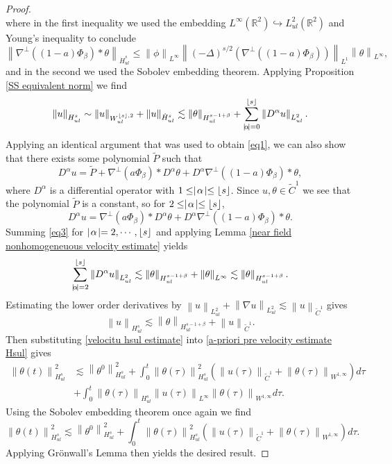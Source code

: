 \documentclass[12pt,xcolor=svgnames]{amsart}
\newcommand{\R}{\mathbb{R}}
\newcommand{\abs}[1]{\mid\!#1\!\mid}
\newcommand{\norm}[2]{\left\lVert#1\right\rVert_{#2}}
\DeclarePairedDelimiter\floor{\lfloor}{\rfloor}
\begin{document}
\begin{proof}
$$$$
where in the first inequality we used the embedding $L^{\infty}(\R^2) \hookrightarrow L^2_{ul}(\R^2)$ and Young's inequality to conclude
$$
\norm{\nabla^{\perp}((1-a)\Phi_{\beta}) \ast \theta}{\dot{H}^s_{ul}}\leq \norm{\phi}{L^{\infty}}\norm{(-\Delta)^{s/2}(\nabla^{\perp}((1-a)\Phi_{\beta}))}{L^1}\norm{\theta}{L^{\infty}},
$$
and in the second we used the Sobolev embedding theorem. Applying Proposition \ref{SS equivalent norm} we find
$$
\norm{u}{H_{ul}^s} \sim \norm{u}{W_{ul}^{\floor{s},2}} + \norm{u}{\dot{H}_{ul}^s} \lesssim \norm{\theta}{H_{ul}^{s-1+\beta}}+\sum_{\abs{\alpha}=0}^{\floor{s}} \norm{D^{\alpha} u}{L_{ul}^2}.
$$
Applying an identical argument that was used to obtain \eqref{eq1}, we can also show that there exists some polynomial $\tilde{P}$ such that 
\begin{equation}
\label{eq2}
D^{\alpha} u = \tilde{P} + \nabla^{\perp}(a\Phi_{\beta}) \ast D^{\alpha} \theta + D^{\alpha} \nabla^{\perp}((1-a)\Phi_{\beta}) \ast \theta,
\end{equation}
where $D^{\alpha}$ is a differential operator with $1 \leq \abs{\alpha}\leq \floor{s}$. Since $u,\theta \in \tilde{C}^1$ we see that the polynomial $\tilde{P}$ is a constant, so for $2 \leq \abs{\alpha} \leq \floor{s}$,  
\begin{equation}
\label{eq3}
D^{\alpha} u = \nabla^{\perp}(a\Phi_{\beta}) \ast D^{\alpha} \theta + D^{\alpha} \nabla^{\perp}((1-a)\Phi_{\beta}) \ast \theta.
\end{equation}
Summing \eqref{eq3} for $\abs{\alpha}=2,\cdots,\floor{s}$  and applying Lemma \ref{near field nonhomogeneuous velocity estimate} yields
$$
\sum_{\abs{\alpha}=2}^{\floor{s}} \norm{D^{\alpha} u}{L_{ul}^2} \lesssim \norm{\theta}{H_{ul}^{s-1+\beta}}+\norm{\theta}{L^{\infty}}\lesssim \norm{\theta}{H^{s-1+\beta}_{ul}}.
$$
Estimating the lower order derivatives by $\norm{u}{L_{ul}^2} + \norm{\nabla u}{L_{ul}^2} \lesssim  \norm{u}{\tilde{C}^1}$ gives
 \begin{equation}
 \label{velocitu hsul estimate}
 \norm{u}{H^s_{ul}} \lesssim \norm{\theta}{H_{ul}^{s-1+\beta}}+\norm{u}{\tilde{C}^1}.
 \end{equation}
 Then substituting \eqref{velocitu hsul estimate} into \eqref{a-priori pre velocity estimate Hsul} gives
\begin{align*}
\norm{\theta(t)}{H_{ul}^s}^2 & \lesssim \norm{\theta^0}{H_{ul}^s}^2 + \int_0^t \norm{\theta(\tau)}{H_{ul}^s}^2(\norm{u(\tau)}{\tilde{C}^1} + \norm{\theta(\tau)}{W^{1,\infty}})d\tau \\
&+\int_0^t \norm{\theta(\tau)}{H_{ul}^s}\norm{u(\tau)}{L^{\infty}}\norm{\theta(\tau)}{W^{1,\infty}}d\tau.
\end{align*}
Using the Sobolev embedding theorem once again we find 
$$
\norm{\theta(t)}{H_{ul}^s}^2 \lesssim \norm{\theta^0}{H_{ul}^s}^2 + \int_0^t \norm{\theta(\tau)}{H_{ul}^s}^2(\norm{u(\tau)}{\tilde{C}^1} + \norm{\theta(\tau)}{W^{1,\infty}})d\tau.
$$
Applying Grönwall's Lemma then yields the desired result.
\end{proof} 
\end{document}
